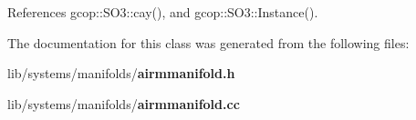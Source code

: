 \-References gcop\-::\-S\-O3\-::cay(), and gcop\-::\-S\-O3\-::\-Instance().



\-The documentation for this class was generated from the following files\-:\begin{DoxyCompactItemize}
\item 
lib/systems/manifolds/{\bf airmmanifold.\-h}\item 
lib/systems/manifolds/{\bf airmmanifold.\-cc}\end{DoxyCompactItemize}
